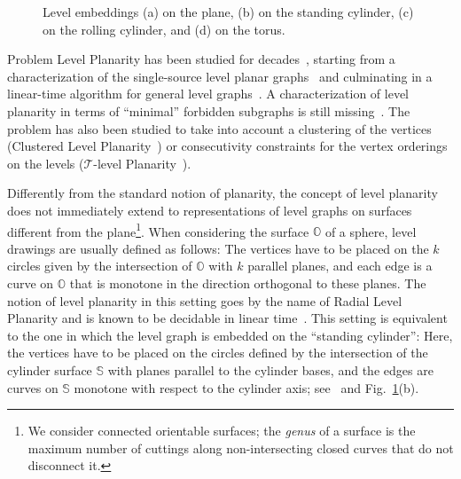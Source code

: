 \documentclass{llncs}
\begin{document}
\begin{figure}[tb!]
    \centering
      \hfill
      \hfill
      \hfill
    \caption{Level embeddings (a) on the plane, (b) on the standing cylinder, (c) on the rolling cylinder, and (d) on the torus.}
\label{fig:drawings}
\end{figure}

Problem {\sc Level Planarity} has been studied for decades~\cite{dn-hpt-88,hp-rlpdlt-95,jlm-lptlt-98,rsbhkmsc-sfplg-01,Fulek2013}, starting from a characterization of the single-source level planar graphs~\cite{dn-hpt-88} and culminating in a linear-time algorithm for general level graphs~\cite{jlm-lptlt-98}.
A characterization of level planarity in terms of ``minimal'' forbidden subgraphs is still missing~\cite{efk-clptmp-09,hkl-clpg-04}.
The problem has also been studied to take into account a clustering of the vertices ({\sc Clustered Level Planarity}~\cite{tibp-addfr-15,fb-clp-04}) or consecutivity constraints for the vertex orderings on the levels ({\sc $\mathcal{T}$-level Planarity}~\cite{tibp-addfr-15,wsp-gktlg-12}).

Differently from the standard notion of planarity, the concept of level planarity does not immediately extend to representations of level graphs on surfaces different from the plane\footnote{We consider connected orientable surfaces; the {\em genus} of a surface is the maximum number of cuttings along non-intersecting closed curves that do not disconnect it.}. When considering the surface $\mathbb O$ of a sphere, level drawings are usually defined as follows: The vertices have to be placed on the $k$ circles given by the intersection of $\mathbb O$ with $k$ parallel planes, and each edge is a curve on $\mathbb O$ that is monotone in the direction orthogonal to these planes. The notion of level planarity in this setting goes by the name of {\sc Radial Level Planarity} and is known to be decidable in linear time~\cite{bbf-rlptelt-05}. This setting is equivalent to the one in which the level graph is embedded on the ``standing cylinder'': Here, the vertices have to be placed on the circles defined by the intersection of the cylinder surface $\mathbb S$ with planes parallel to the cylinder bases, and the edges are curves on $\mathbb S$ monotone with respect to the cylinder axis; see~\cite{abbg-cpue-12,bbf-rlptelt-05,b-updsrc-14} and Fig.~\ref{fig:drawings}(b).  
\end{document}
